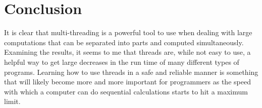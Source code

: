 \documentclass[11pt]{article} %
\begin{document}
\section*{Conclusion}
It is clear that multi-threading is a powerful tool to use when dealing with large computations that can be separated into parts and computed simultaneously. Examining the results, it seems to me that threads are, while not easy to use, a helpful way to get large decreases in the run time of many different types of programs. Learning how to use threads in a safe and reliable manner is something that will likely become more and more important for programmers as the speed with which a computer can do sequential calculations starts to hit a maximum limit. 
\end{document}
